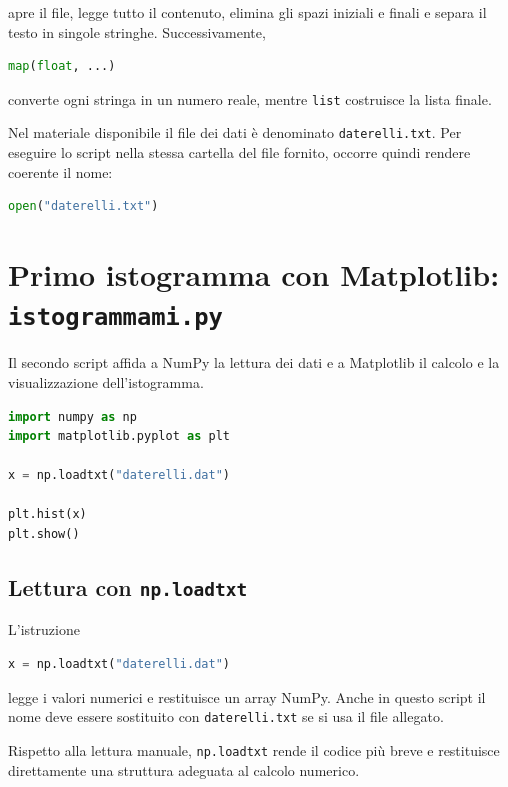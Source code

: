 \documentclass[11pt,a4paper]{book}
\begin{document}
apre il file, legge tutto il contenuto, elimina gli spazi iniziali e
finali e separa il testo in singole stringhe. Successivamente,

\begin{lstlisting}[language=Python]
map(float, ...)
\end{lstlisting}

converte ogni stringa in un numero reale, mentre \texttt{list} costruisce
la lista finale.

Nel materiale disponibile il file dei dati è denominato
\texttt{daterelli.txt}. Per eseguire lo script nella stessa cartella del
file fornito, occorre quindi rendere coerente il nome:

\begin{lstlisting}[language=Python]
open("daterelli.txt")
\end{lstlisting}

\section{Primo istogramma con Matplotlib: \texttt{istogrammami.py}}

Il secondo script affida a NumPy la lettura dei dati e a Matplotlib il
calcolo e la visualizzazione dell'istogramma.

\begin{lstlisting}[language=Python]
import numpy as np
import matplotlib.pyplot as plt

x = np.loadtxt("daterelli.dat")

plt.hist(x)
plt.show()
\end{lstlisting}

\subsection{Lettura con \texttt{np.loadtxt}}

L'istruzione

\begin{lstlisting}[language=Python]
x = np.loadtxt("daterelli.dat")
\end{lstlisting}

legge i valori numerici e restituisce un array NumPy. Anche in questo
script il nome deve essere sostituito con \texttt{daterelli.txt} se si
usa il file allegato.

Rispetto alla lettura manuale, \texttt{np.loadtxt} rende il codice più
breve e restituisce direttamente una struttura adeguata al calcolo
numerico.
\end{document}
